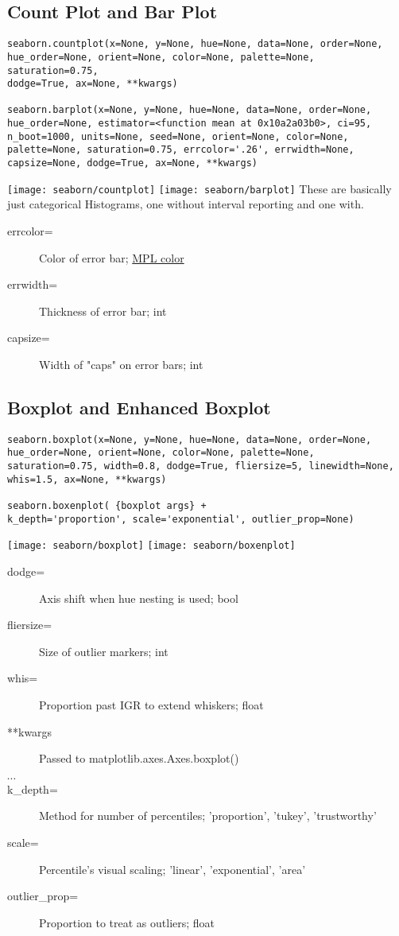 \subsection{Count Plot and Bar Plot}
\begin{verbatim}
seaborn.countplot(x=None, y=None, hue=None, data=None, order=None,
hue_order=None, orient=None, color=None, palette=None, saturation=0.75,
dodge=True, ax=None, **kwargs)

seaborn.barplot(x=None, y=None, hue=None, data=None, order=None,
hue_order=None, estimator=<function mean at 0x10a2a03b0>, ci=95,
n_boot=1000, units=None, seed=None, orient=None, color=None,
palette=None, saturation=0.75, errcolor='.26', errwidth=None,
capsize=None, dodge=True, ax=None, **kwargs)
\end{verbatim}
\texttt{[image: seaborn/countplot]}
\texttt{[image: seaborn/barplot]}
These are basically just categorical Histograms, one without interval reporting and one with.
\begin{description}
	\item[errcolor=] Color of error bar; \hyperref[sec:MPLColors]{MPL color}
	\item[errwidth=] Thickness of error bar; int
	\item[capsize=] Width of "caps" on error bars; int
\end{description}

\subsection{Boxplot and Enhanced Boxplot}
\begin{verbatim}
seaborn.boxplot(x=None, y=None, hue=None, data=None, order=None,
hue_order=None, orient=None, color=None, palette=None, 
saturation=0.75, width=0.8, dodge=True, fliersize=5, linewidth=None,
whis=1.5, ax=None, **kwargs)

seaborn.boxenplot( {boxplot args} +
k_depth='proportion', scale='exponential', outlier_prop=None)
\end{verbatim}
\texttt{[image: seaborn/boxplot]}
\texttt{[image: seaborn/boxenplot]}
\begin{description}
	\item[dodge=] Axis shift when hue nesting is used; bool
	\item[fliersize=] Size of outlier markers; int
	\item[whis=] Proportion past IGR to extend whiskers; float
	\item[**kwargs] Passed to matplotlib.axes.Axes.boxplot()
	\item[$\cdots$] 
	\item[k\_depth=] Method for number of percentiles; 'proportion', 'tukey', 'trustworthy'
	\item[scale=] Percentile's visual scaling; 'linear', 'exponential', 'area'
	\item[outlier\_prop=] Proportion to treat as outliers; float
\end{description}

